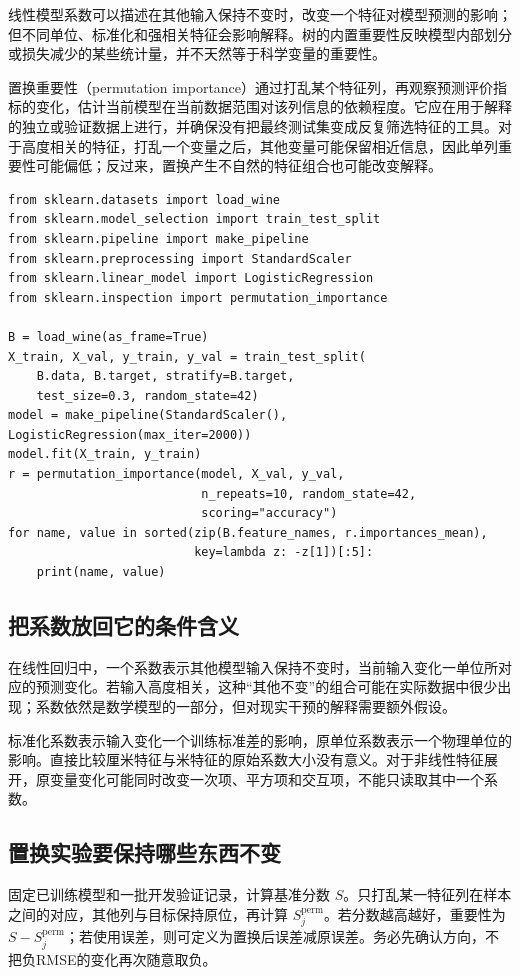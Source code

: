 线性模型系数可以描述在其他输入保持不变时，改变一个特征对模型预测的影响；但不同单位、标准化和强相关特征会影响解释。树的内置重要性反映模型内部划分或损失减少的某些统计量，并不天然等于科学变量的重要性。

置换重要性（permutation importance）通过打乱某个特征列，再观察预测评价指标的变化，估计当前模型在当前数据范围对该列信息的依赖程度。它应在用于解释的独立或验证数据上进行，并确保没有把最终测试集变成反复筛选特征的工具。对于高度相关的特征，打乱一个变量之后，其他变量可能保留相近信息，因此单列重要性可能偏低；反过来，置换产生不自然的特征组合也可能改变解释。

\begin{lstlisting}[caption={Wine 分类模型的置换重要性示例}]
from sklearn.datasets import load_wine
from sklearn.model_selection import train_test_split
from sklearn.pipeline import make_pipeline
from sklearn.preprocessing import StandardScaler
from sklearn.linear_model import LogisticRegression
from sklearn.inspection import permutation_importance

B = load_wine(as_frame=True)
X_train, X_val, y_train, y_val = train_test_split(
    B.data, B.target, stratify=B.target,
    test_size=0.3, random_state=42)
model = make_pipeline(StandardScaler(), LogisticRegression(max_iter=2000))
model.fit(X_train, y_train)
r = permutation_importance(model, X_val, y_val,
                           n_repeats=10, random_state=42,
                           scoring="accuracy")
for name, value in sorted(zip(B.feature_names, r.importances_mean),
                          key=lambda z: -z[1])[:5]:
    print(name, value)
\end{lstlisting}


\subsection{把系数放回它的条件含义}
在线性回归中，一个系数表示其他模型输入保持不变时，当前输入变化一单位所对应的预测变化。若输入高度相关，这种“其他不变”的组合可能在实际数据中很少出现；系数依然是数学模型的一部分，但对现实干预的解释需要额外假设。

标准化系数表示输入变化一个训练标准差的影响，原单位系数表示一个物理单位的影响。直接比较厘米特征与米特征的原始系数大小没有意义。对于非线性特征展开，原变量变化可能同时改变一次项、平方项和交互项，不能只读取其中一个系数。

\subsection{置换实验要保持哪些东西不变}
固定已训练模型和一批开发验证记录，计算基准分数 $S$。只打乱某一特征列在样本之间的对应，其他列与目标保持原位，再计算 $S_j^\mathrm{perm}$。若分数越高越好，重要性为 $S-S_j^\mathrm{perm}$；若使用误差，则可定义为置换后误差减原误差。务必先确认方向，不把负RMSE的变化再次随意取负。

